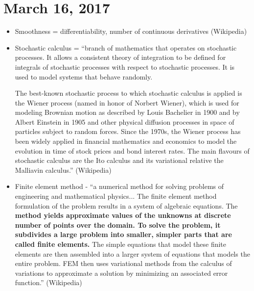 \documentclass{article}
\begin{document}
\section*{March 16, 2017}
\begin{itemize}
\item Smoothness = differentiability, number of continuous derivatives (Wikipedia) 
\item Stochastic calculus = ``branch of mathematics that operates on stochastic processes. It allows a consistent theory of integration to be defined for integrals of stochastic processes with respect to stochastic processes. It is used to model systems that behave randomly.

The best-known stochastic process to which stochastic calculus is applied is the Wiener process (named in honor of Norbert Wiener), which is used for modeling Brownian motion as described by Louis Bachelier in 1900 and by Albert Einstein in 1905 and other physical diffusion processes in space of particles subject to random forces. Since the 1970s, the Wiener process has been widely applied in financial mathematics and economics to model the evolution in time of stock prices and bond interest rates.
The main flavours of stochastic calculus are the Ito calculus and its variational relative the Malliavin calculus.'' (Wikipedia) 

\item Finite element method - ``a numerical method for solving problems of engineering and mathematical physics... The finite element method formulation of the problem results in a system of algebraic equations. The {\bf method yields approximate values of the unknowns at discrete number of points over the domain. To solve the problem, it subdivides a large problem into smaller, simpler parts that are called finite elements.} The simple equations that model these finite elements are then assembled into a larger system of equations that models the entire problem. FEM then uses variational methods from the calculus of variations to approximate a solution by minimizing an associated error function.'' (Wikipedia) 
\end{itemize}
\end{document}

